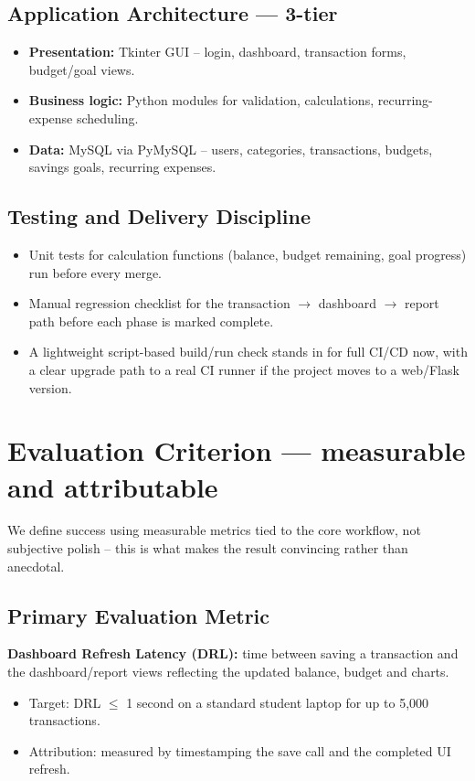 \documentclass{article}
\begin{document}
\subsection{Application Architecture --- 3-tier}
\begin{itemize}[noitemsep]
  \item \textbf{Presentation:} Tkinter GUI -- login, dashboard, transaction forms, budget/goal views.
  \item \textbf{Business logic:} Python modules for validation, calculations, recurring-expense scheduling.
  \item \textbf{Data:} MySQL via PyMySQL -- users, categories, transactions, budgets, savings goals, recurring expenses.
\end{itemize}

\subsection{Testing and Delivery Discipline}
\begin{itemize}[noitemsep]
  \item Unit tests for calculation functions (balance, budget remaining, goal progress) run before every merge.
  \item Manual regression checklist for the transaction $\rightarrow$ dashboard $\rightarrow$ report path before each phase is marked complete.
  \item A lightweight script-based build/run check stands in for full CI/CD now, with a clear upgrade path to a real CI runner if the project moves to a web/Flask version.
\end{itemize}

\section{Evaluation Criterion --- measurable and attributable}
We define success using measurable metrics tied to the core workflow, not subjective polish -- this is what makes the result convincing rather than anecdotal.

\subsection{Primary Evaluation Metric}
\textbf{Dashboard Refresh Latency (DRL):} time between saving a transaction and the dashboard/report views reflecting the updated balance, budget and charts.
\begin{itemize}[noitemsep]
  \item Target: DRL $\leq$ 1 second on a standard student laptop for up to 5{,}000 transactions.
  \item Attribution: measured by timestamping the save call and the completed UI refresh.
\end{itemize}
\end{document}
